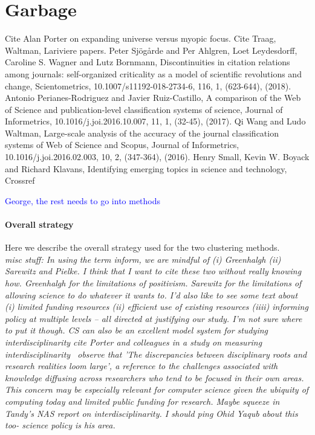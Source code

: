 \section{Garbage}

Cite Alan Porter on expanding universe versus myopic focus. Cite Traag, Waltman, Lariviere papers. Peter Sjögårde and Per Ahlgren, Loet Leydesdorff, Caroline S. Wagner and Lutz Bornmann, Discontinuities in citation relations among journals: self-organized criticality as a model of scientific revolutions and change, Scientometrics, 10.1007/s11192-018-2734-6, 116, 1, (623-644), (2018). Antonio Perianes-Rodriguez and Javier Ruiz-Castillo, A comparison of the Web of Science and publication-level classification systems of science, Journal of Informetrics, 10.1016/j.joi.2016.10.007, 11, 1, (32-45), (2017). Qi Wang and Ludo Waltman, Large-scale analysis of the accuracy of the journal classification systems of Web of Science and Scopus, Journal of Informetrics, 10.1016/j.joi.2016.02.003, 10, 2, (347-364), (2016). Henry Small, Kevin W. Boyack and Richard Klavans, Identifying emerging topics in science and technology, 
Crossref

\textcolor{blue}{George, the rest needs to go into methods}


\paragraph{Overall strategy}

Here we describe the overall strategy used for the two clustering methods.\\

\emph{misc stuff:  In using the term inform, we are mindful of (i) Greenhalgh (ii) Sarewitz and Pielke. I think that I want to cite these two without really knowing how. Greenhalgh for the limitations of positivism. Sarewitz for the limitations of allowing science to do whatever it wants to. I'd also like to see some text about (i) limited funding resources (ii) efficient use of existing resources (iiii) informing policy at multiple levels -- all directed at justifying our study. I'm not sure where to put it though. CS can also be an excellent model system for studying interdisciplinarity cite Porter and colleagues in a study on measuring interdisciplinarity~\cite{porter_measuring_2007} observe that 'The discrepancies between disciplinary roots and research realities loom large', a reference to the challenges associated with knowledge diffusing across researchers who tend to be focused in their own areas. This concern may be especially relevant for computer science given the ubiquity of computing today and limited public funding for research. Maybe squeeze in Tandy's NAS report on interdisciplinarity. I should ping Ohid Yaqub about this too- science policy is his area.}


